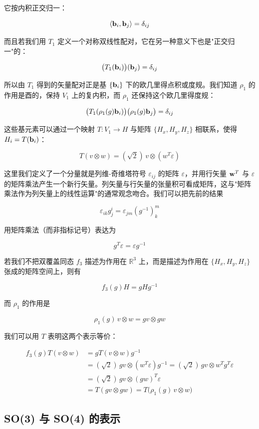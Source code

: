它按内积正交归一：

\[
\langle\mathbf{b}_{i},\mathbf{b}_{j}\rangle=\delta_{ij}
\]

而且若我们用 $T_{1}$ 定义一个对称双线性配对，它在另一种意义下也是"正交归一"的：

\[
\bigl(T_{1}(\mathbf{b}_{i})\bigr)(\mathbf{b}_{j})=\delta_{ij}
\]

所以由 $T_{1}$ 得到的矢量配对正是基 $\{\mathbf{b}_{i}\}$ 下的欧几里得点积或度规。我们知道 $\rho_{1}$ 的作用是酉的，保持 $V_{1}$ 上的复内积，而 $\rho_{1}$ 还保持这个欧几里得度规：

\[
\bigl(T_{1}(\rho_{1}(g)\mathbf{b}_{i})\bigr)\bigl(\rho_{1}(g)\mathbf{b}_{j}\bigr)=\delta_{ij}
\]

这些基元素可以通过一个映射 $T:V_{1}\to H$ 与矩阵 $\{H_{x},H_{y},H_{z}\}$ 相联系，使得 $H_{i}=T(\mathbf{b}_{i})$：

\[
T(v\otimes w)=(\sqrt{2})\,v\otimes(w^{T}\varepsilon)
\]

这里我们定义了一个分量就是列维-奇维塔符号 $\varepsilon_{ij}$ 的矩阵 $\varepsilon$，并用行矢量 $\mathbf{w}^{T}$ 与 $\varepsilon$ 的矩阵乘法产生一个新行矢量。列矢量与行矢量的张量积可看成矩阵，这与"矩阵乘法作为列矢量上的线性运算"的通常观念吻合。我们可以把先前的结果

\[
\varepsilon_{ik}g^{i}_{j}=\varepsilon_{jm}(g^{-1})^{m}_{k}
\]

用矩阵乘法（而非指标记号）表达为

\[
g^{T}\varepsilon=\varepsilon g^{-1}
\]

若我们不把双覆盖同态 $f_{3}$ 描述为作用在 $\mathbb{R}^{3}$ 上，而是描述为作用在 $\{H_{x},H_{y},H_{z}\}$ 张成的矩阵空间上，则有

\[
f_{3}(g)H=gHg^{-1}
\]

而 $\rho_{1}$ 的作用是

\[
\rho_{1}(g)\,v\otimes w=gv\otimes gw
\]

我们可以用 $T$ 表明这两个表示等价：

\begin{align*}
f_{3}(g)T(v\otimes w)
&=gT(v\otimes w)g^{-1}\\
&=(\sqrt{2})\,gv\otimes(w^{T}\varepsilon)g^{-1}
=(\sqrt{2})\,gv\otimes w^{T}g^{T}\varepsilon\\
&=(\sqrt{2})\,gv\otimes(gw)^{T}\varepsilon\\
&=T(gv\otimes gw)
=T\bigl(\rho_{1}(g)\,v\otimes w\bigr)
\end{align*}

\subsection{SO(3) 与 SO(4) 的表示}

